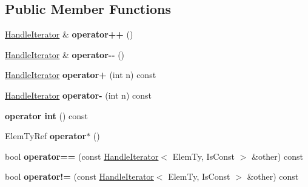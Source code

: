 \subsection*{Public Member Functions}
\begin{DoxyCompactItemize}
\item 
\mbox{\label{classglow_1_1_handle_iterator_ac398e8510decbf1c8a1ecfaec8e667a0}} 
\hyperlink{classglow_1_1_handle_iterator}{Handle\+Iterator} \& {\bfseries operator++} ()
\item 
\mbox{\label{classglow_1_1_handle_iterator_a82f3ab7202eeddd1c7979a663b398c21}} 
\hyperlink{classglow_1_1_handle_iterator}{Handle\+Iterator} \& {\bfseries operator-\/-\/} ()
\item 
\mbox{\label{classglow_1_1_handle_iterator_a3c508d725a41e5282de2721128e59b9a}} 
\hyperlink{classglow_1_1_handle_iterator}{Handle\+Iterator} {\bfseries operator+} (int n) const
\item 
\mbox{\label{classglow_1_1_handle_iterator_ab2f790803a2868c823e0f3fa38a84826}} 
\hyperlink{classglow_1_1_handle_iterator}{Handle\+Iterator} {\bfseries operator-\/} (int n) const
\item 
\mbox{\label{classglow_1_1_handle_iterator_a1f1ff215bddc4c9b1ef40f47101e9533}} 
{\bfseries operator int} () const
\item 
\mbox{\label{classglow_1_1_handle_iterator_a21b65a14632927f6a9c37997b17fa83c}} 
Elem\+Ty\+Ref {\bfseries operator$\ast$} ()
\item 
\mbox{\label{classglow_1_1_handle_iterator_a0ba87c7c5fa831b9f636fff9a5f8d9a7}} 
bool {\bfseries operator==} (const \hyperlink{classglow_1_1_handle_iterator}{Handle\+Iterator}$<$ Elem\+Ty, Is\+Const $>$ \&other) const
\item 
\mbox{\label{classglow_1_1_handle_iterator_a664b1101bdae554d8f0128cc26531dab}} 
bool {\bfseries operator!=} (const \hyperlink{classglow_1_1_handle_iterator}{Handle\+Iterator}$<$ Elem\+Ty, Is\+Const $>$ \&other) const
\end{DoxyCompactItemize}
